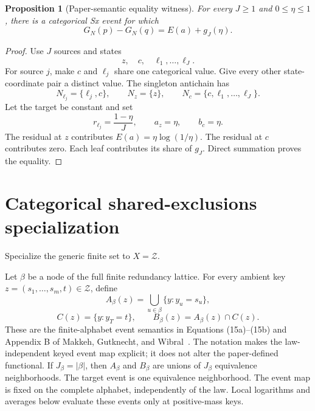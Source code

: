 \documentclass[11pt]{article}
\newtheorem{proposition}[theorem]{Proposition}
\theoremstyle{definition}
\newcommand{\cZ}{\mathcal{Z}}
\begin{document}
\begin{proposition}[Paper-semantic equality witness]\label{prop:sharp}
For every \(J\ge1\) and \(0\le\eta\le1\), there is a categorical Sx event for which
\begin{equation}
  G_N(p)-G_N(q)=E(a)+g_J(\eta).
\end{equation}
\end{proposition}

\begin{proof}
Use \(J\) sources and states
\begin{equation}
  z,\quad c,\quad\ell_1,\ldots,\ell_J.
\end{equation}
For source \(j\), make \(c\) and \(\ell_j\) share one categorical value.  Give every other
state-coordinate pair a distinct value.  The singleton antichain has
\begin{equation}
  N_{\ell_j}=\{\ell_j,c\},
  \qquad
  N_z=\{z\},
  \qquad
  N_c=\{c,\ell_1,\ldots,\ell_J\}.
\end{equation}
Let the target be constant and set
\begin{equation}
  r_{\ell_j}=\frac{1-\eta}{J},
  \qquad
  a_z=\eta,
  \qquad
  b_c=\eta.
\end{equation}
The residual at \(z\) contributes \(E(a)=\eta\log(1/\eta)\).  The residual at \(c\) contributes
zero.  Each leaf contributes its share of \(g_J\).  Direct summation proves the equality.
\end{proof}

\section{Categorical shared-exclusions specialization}

Specialize the generic finite set to \(X=\cZ\).

Let \(\beta\) be a node of the full finite redundancy lattice.  For every ambient key
\(z=(s_1,\ldots,s_m,t)\in\cZ\), define
\begin{equation}
  A_\beta(z)
  =
  \bigcup_{u\in\beta}\{y:y_u=s_u\},
\end{equation}
\begin{equation}
  C(z)=\{y:y_T=t\},
  \qquad
  B_\beta(z)=A_\beta(z)\cap C(z).
\end{equation}
These are the finite-alphabet event semantics in Equations (15a)--(15b) and Appendix B
of Makkeh, Gutknecht, and Wibral~\cite{makkeh2021}.  The notation makes the law-independent keyed
event map explicit; it does not alter the paper-defined functional.
If \(J_\beta=|\beta|\), then \(A_\beta\) and \(B_\beta\) are unions of \(J_\beta\) equivalence
neighborhoods.  The target event is one equivalence neighborhood.
The event map is fixed on the complete alphabet, independently of the law.  Local logarithms and
averages below evaluate these events only at positive-mass keys.
\end{document}
